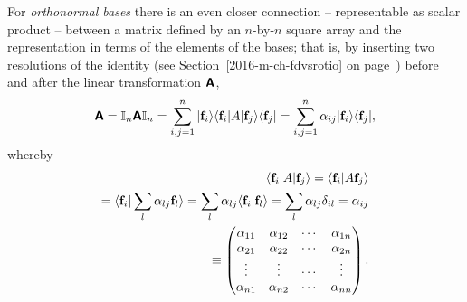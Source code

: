 For {\em orthonormal bases}
there is an even closer connection -- representable as scalar product -- between a matrix
defined by an $n$-by-$n$ square array and the representation in terms of the elements of the bases; that is,
 by inserting
two resolutions of the identity (see Section~\ref{2016-m-ch-fdvsrotio} on page~\pageref{2016-m-ch-fdvsrotio}) before and after the
linear transformation $\textsf{\textbf{A}}$,
\begin{equation}
\textsf{\textbf{A}}  =
{\Bbb I}_n \textsf{\textbf{A}} {\Bbb I}_n  =
\sum_{i,j=1}^n
\vert {\bf f}_i\rangle \langle {\bf f}_i\vert A\vert {\bf f}_j\rangle \langle {\bf f}_j\vert  =
\sum_{i,j=1}^n \alpha_{ij}
\vert {\bf f}_i\rangle  \langle {\bf f}_j\vert,
\end{equation}
whereby
\begin{equation}
\begin{split}
 \langle {\bf f}_i \vert A \vert {\bf f}_j\rangle
= \langle {\bf f}_i \vert A   {\bf f}_j\rangle \\
= \langle {\bf f}_i \vert \sum_l \alpha_{lj}{\bf f}_l \rangle
=  \sum_l \alpha_{lj} \langle {\bf f}_i \vert {\bf f}_l \rangle
=  \sum_l \alpha_{lj} \delta_{il}  = \alpha_{ij} \\
\equiv
\begin{pmatrix}
\alpha_{11}&
\alpha_{12}&
\cdots    &
\alpha_{1n}\\
\alpha_{21}&
\alpha_{22}&
\cdots    &
\alpha_{2n}\\
\vdots&
\vdots&
\cdots    &
\vdots\\
\alpha_{n1}&
\alpha_{n2}&
\cdots   &
\alpha_{nn}
\end{pmatrix}
.
\end{split}
\end{equation}







